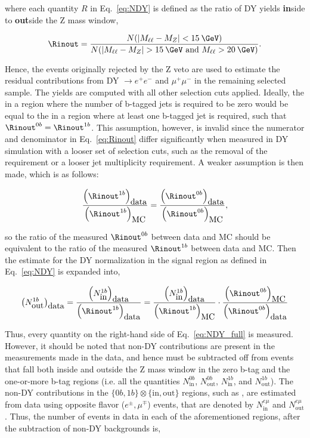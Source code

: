 where each quantity $R$ in Eq.~\ref{eq:NDY} is defined as the ratio of DY yields \textbf{in}side to \textbf{out}side the Z mass window, 

\begin{equation}
  \Rinout = \frac{N(|M_{\ell\ell} - M_Z|<15\:\GeV)}{N(|M_{\ell\ell} - M_Z|>15\:\GeV\mbox{ and }M_{\ell\ell}>20\:\GeV)}.
  \label{eq:Rinout}
\end{equation}

Hence, the events originally rejected by the Z veto are used to estimate the residual contributions from DY $\rightarrow e^+e^-$ and $\mu^+\mu^-$ in the remaining selected sample. The yields are computed with all other selection cuts applied. Ideally, the \Rinout in a region where the number of b-tagged jets is required to be zero would be equal to the \Rinout in a region where at least one b-tagged jet is required, such that $\Rinout^{0b} = \Rinout^{1b}$. This assumption, however, is invalid since the numerator and denominator in Eq.~\ref{eq:Rinout} differ significantly when measured in DY simulation with a looser set of selection cuts, such as the removal of the \ptmiss requirement or a looser jet multiplicity requirement. A weaker assumption is then made, which is as follows:

\begin{equation}
  \frac{\left(\Rinout^{1b}\right)_{\mbox{data}}}{\left(\Rinout^{1b}\right)_{\mbox{MC}}} = 
  \frac{\left(\Rinout^{0b}\right)_{\mbox{data}}}{\left(\Rinout^{0b}\right)_{\mbox{MC}}},
  \label{eq:Rassump}
\end{equation}

so the ratio of the measured $\Rinout^{0b}$ between data and MC should be equivalent to the ratio of the measured $\Rinout^{1b}$ between data and MC. Then the estimate for the DY normalization in the signal region as defined in Eq.~\ref{eq:NDY} is expanded into,

\begin{equation}
  \left(N^{1b}_{\mbox{out}}\right)_{\mbox{data}} =
  \frac{\left(N^{1b}_{\mbox{in}}\right)_{\mbox{data}}}{\left(\Rinout^{1b}\right)_{\mbox{data}}} = 
  \frac{\left(N^{1b}_{\mbox{in}}\right)_{\mbox{data}}}{\left(\Rinout^{1b}\right)_{\mbox{MC}}} \cdot 
  \frac{\left(\Rinout^{0b}\right)_{\mbox{MC}}}{\left(\Rinout^{0b}\right)_{\mbox{data}}}
  \label{eq:NDY_full}
\end{equation}

Thus, every quantity on the right-hand side of Eq.~\ref{eq:NDY_full} is measured. However, it should be noted that non-DY contributions are present in the measurements made in the data, and hence must be subtracted off from events that fall both inside and outside the Z mass window in the zero b-tag and the one-or-more b-tag regions (i.e. all the quantities $N^{0b}_\text{in}$, $N^{0b}_\text{out}$, $N^{1b}_\text{in}$, and $N^{1b}_\text{out}$). The non-DY contributions in the $\{0b,1b\} \otimes \{\text{in},\text{out}\}$ regions, such as \ttll, are estimated from data using opposite flavor ($e^{\pm},\mu^{\mp}$) events, that are denoted by $N^{e\mu}_\text{in}$ and $N^{e\mu}_\text{out}$. Thus, the number of events in data in each of the aforementioned regions, after the subtraction of non-DY backgrounds is,


